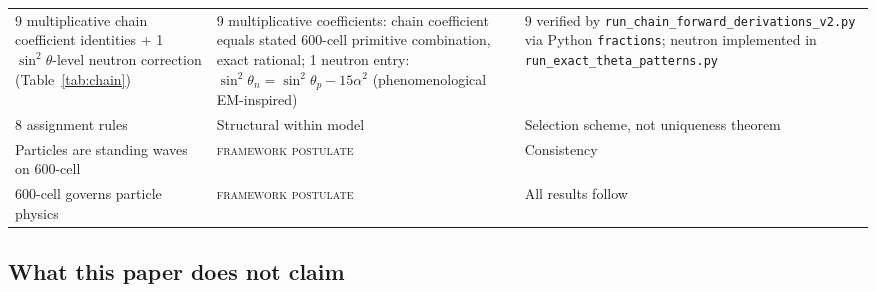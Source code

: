 \documentclass[12pt]{article}
\begin{document}
\begin{table}[ht]
\begin{tabular}{@{}lll@{}}
9 multiplicative chain coefficient identities + 1 $\sin^2\theta$-level neutron correction (Table~\ref{tab:chain}) & 9 multiplicative coefficients: chain coefficient equals stated 600-cell primitive combination, exact rational; 1 neutron entry: $\sin^2\theta_n = \sin^2\theta_p - 15\alpha^2$ (phenomenological EM-inspired) & 9 verified by \texttt{run\_chain\_forward\_derivations\_v2.py} via Python \texttt{fractions}; neutron implemented in \texttt{run\_exact\_theta\_patterns.py} \\
8 assignment rules & Structural within model & Selection scheme, not uniqueness theorem \\
\midrule
Particles are standing waves on 600-cell & \textsc{framework postulate} & Consistency \\
600-cell governs particle physics & \textsc{framework postulate} & All results follow \\
\bottomrule
\end{tabular}
\end{table}

\subsection*{What this paper does not claim}
\end{document}
